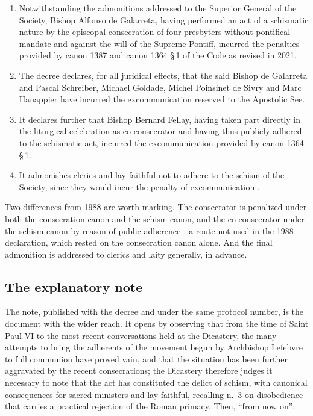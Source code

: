 \begin{enumerate}
\item Notwithstanding the admonitions addressed to the Superior General
of the Society, Bishop Alfonso de Galarreta, having performed an act of a
schismatic nature by the episcopal consecration of four presbyters
without pontifical mandate and against the will of the Supreme Pontiff,
incurred  the penalties provided by canon 1387 and
canon 1364 \S\,1 of the Code as revised in 2021.
\item The decree declares, for all juridical effects, that the said
Bishop de Galarreta and Pascal Schreiber, Michael Goldade, Michel
Poinsinet de Sivry and Marc Hanappier have incurred 
the excommunication  reserved to the Apostolic
See.
\item It declares further that Bishop Bernard Fellay, having taken part
directly in the liturgical celebration as co-consecrator and having thus
publicly adhered to the schismatic act, incurred the excommunication
 provided by canon 1364 \S\,1.
\item It admonishes clerics and lay faithful not to adhere to the schism
of the Society, since they would  incur the penalty of
excommunication .
\end{enumerate}

Two differences from 1988 are worth marking. The consecrator is
penalized under both the consecration canon and the schism canon, and the
co-consecrator under the schism canon by reason of public adherence---a
route not used in the 1988 declaration, which rested on the consecration
canon alone. And the final admonition is addressed to clerics and laity
generally, in advance.

\subsection{The explanatory note}

The note, published with the decree and under the same protocol number,
is the document with the wider reach. It opens by observing that from the
time of Saint Paul VI to the most recent conversations held at the
Dicastery, the many attempts to bring the adherents of the movement begun
by Archbishop Lefebvre to full communion have proved vain, and that the
situation has been further aggravated by the recent consecrations; the
Dicastery therefore judges it necessary to note that the act has
constituted the delict of schism, with canonical consequences for sacred
ministers and lay faithful, recalling  n.~3 on
disobedience that carries a practical rejection of the Roman primacy.
Then, ``from now on'':

